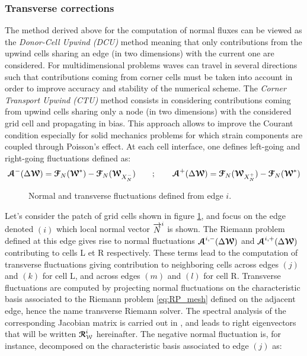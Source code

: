 \subsubsection*{Transverse corrections}
The method derived above for the computation of normal fluxes can be viewed as the \textit{Donor-Cell Upwind (DCU)} method \cite{Leveque} meaning that only contributions from the upwind cells sharing an edge (in two dimensions) with the current one are considered. For multidimensional problems waves can travel in several directions such that contributions coming from corner cells must be taken into account in order to improve accuracy and stability of the numerical scheme. The \textit{Corner Transport Upwind (CTU)} method \cite{Colella_CTU} consists in considering contributions coming from upwind cells sharing only a node (in two dimensions) with the considered grid cell and propagating in bias. This approach allows to improve the Courant condition especially for solid mechanics problems for which strain components are coupled through Poisson's effect. At each cell interface, one defines left-going and right-going fluctuations defined as:
\begin{equation}
  {\boldsymbol{\mathcal{A}}}^-(\Delta {\boldsymbol{\mathcal{W}}}) = {\boldsymbol{\mathcal{F}}}_N({\boldsymbol{\mathcal{W}}}^*) - {\boldsymbol{\mathcal{F}}}_N({\boldsymbol{\mathcal{W}}}_{X_N^-}) \qquad ;  \qquad {\boldsymbol{\mathcal{A}}}^+(\Delta {\boldsymbol{\mathcal{W}}}) = {\boldsymbol{\mathcal{F}}}_N({\boldsymbol{\mathcal{W}}}_{X_N^+})-{\boldsymbol{\mathcal{F}}}_N({\boldsymbol{\mathcal{W}}}^*) 
\end{equation}
\begin{figure}[h!]
  \centering
  
  \caption{Normal and transverse fluctuations defined from edge $i$.}
  \label{fig:CTU}
\end{figure}
Let's consider the patch of grid cells shown in figure \ref{fig:CTU}, and focus on the edge denoted $(i)$ which local normal vector ${\overrightarrow{N}}^i$ is shown. The Riemann problem defined at this edge gives rise to normal fluctuations ${\boldsymbol{\mathcal{A}}}^{i,-}(\Delta {\boldsymbol{\mathcal{W}}})$ and ${\boldsymbol{\mathcal{A}}}^{i,+}(\Delta {\boldsymbol{\mathcal{W}}})$ contributing to cells L et R respectively. These terms lead to the computation of transverse fluctuations giving contribution to neighboring cells across edges $(j)$ and $(k)$ for cell L, and across edges $(m)$ and $(l)$ for cell R. Transverse fluctuations are computed by projecting normal fluctuations on the characteristic basis associated to the Riemann problem \eqref{eq:RP_mesh} defined on the adjacent edge, hence the name transverse Riemann solver. The spectral analysis of the corresponding Jacobian matrix is carried out in \cite{Kluth}, and leads to right eigenvectors that will be written ${\boldsymbol{\mathcal{R}}}_{\mathcal{W}}^i$ hereinafter. The negative normal fluctuation is, for instance, decomposed on the characteristic basis associated to edge $(j)$ as:

